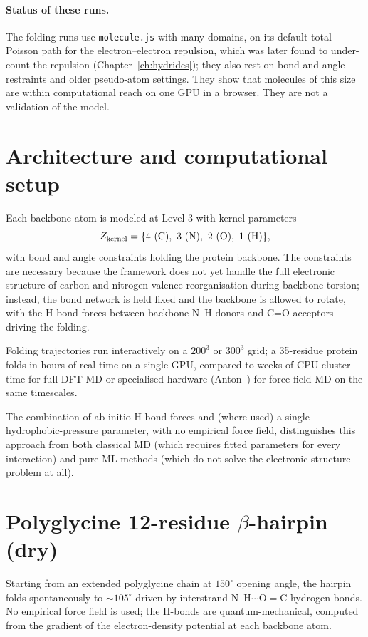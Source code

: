 \paragraph{Status of these runs.} The folding runs use \texttt{molecule.js} with many domains, on its
default total-Poisson path for the electron--electron repulsion, which was later found to under-count the
repulsion (Chapter~\ref{ch:hydrides}); they also rest on bond and angle restraints and older pseudo-atom
settings. They show that molecules of this size are within computational reach on one GPU in a browser.
They are not a validation of the model.

\section{Architecture and computational setup}\label{sec:fold-setup}

Each backbone atom is modeled at Level 3 with kernel parameters
\[
Z_{\rm kernel} = \{4 \text{ (C)},\ 3 \text{ (N)},\ 2 \text{ (O)},\ 1 \text{ (H)}\},
\]
with bond and angle constraints holding the protein backbone. The constraints are necessary because the framework does not yet handle the full electronic structure of carbon and nitrogen valence reorganisation during backbone torsion; instead, the bond network is held fixed and the backbone is allowed to rotate, with the H-bond forces between backbone N--H donors and C=O acceptors driving the folding.

Folding trajectories run interactively on a $200^3$ or $300^3$ grid; a 35-residue protein folds in hours of real-time on a single GPU, compared to weeks of CPU-cluster time for full DFT-MD or specialised hardware (Anton~\cite{Shaw10}) for force-field MD on the same timescales.

The combination of ab initio H-bond forces and (where used) a single hydrophobic-pressure parameter, with no empirical force field, distinguishes this approach from both classical MD (which requires fitted parameters for every interaction) and pure ML methods (which do not solve the electronic-structure problem at all).

\section{Polyglycine 12-residue $\beta$-hairpin (dry)}\label{sec:hairpin}

Starting from an extended polyglycine chain at $150^\circ$ opening angle, the hairpin folds spontaneously to $\sim 105^\circ$ driven by interstrand N--H$\cdots$O$=$C hydrogen bonds. No empirical force field is used; the H-bonds are quantum-mechanical, computed from the gradient of the electron-density potential at each backbone atom.

